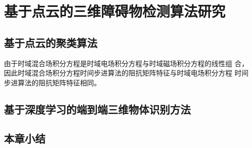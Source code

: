 
\chapter{基于点云的三维障碍物检测算法研究}

\section{基于点云的聚类算法}

由于时域混合场积分方程是时域电场积分方程与时域磁场积分方程的线性组
合，因此时域混合场积分方程时间步进算法的阻抗矩阵特征与时域电场积分方程
时间步进算法的阻抗矩阵特征相同。

\section{基于深度学习的端到端三维物体识别方法}

\section{本章小结}

